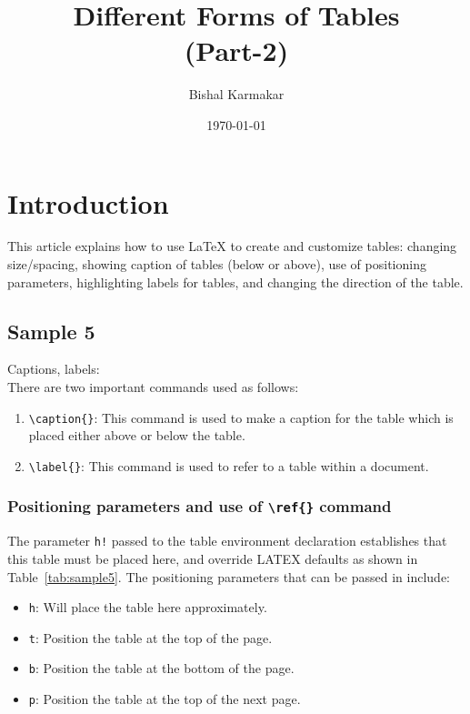 \documentclass{article}
\begin{document}
\title{\textbf{Different Forms of Tables}\\\textbf{ (Part-2)}}
\author{Bishal Karmakar}
\date{\today}
\maketitle

\section{Introduction}
This article explains how to use LaTeX to create and customize tables: changing size/spacing, showing caption of tables (below or above), use of positioning parameters, highlighting labels for tables, and changing the direction of the table.

\subsection{Sample 5}
Captions, labels: \\
There are two important commands used as follows:
\begin{enumerate}
  \item \texttt{\textbackslash caption\{\}}: This command is used to make a caption for the table which is placed either above or below the table.
  \item \texttt{\textbackslash label\{\}}: This command is used to refer to a table within a document.
\end{enumerate}

\subsubsection{Positioning parameters and use of \texttt{\textbackslash ref\{\}} command}
The parameter \texttt{h!} passed to the table environment declaration establishes that this table must be placed here, and override LATEX defaults as shown in Table~\ref{tab:sample5}. The positioning parameters that can be passed in include:
\begin{itemize}
  \item \texttt{h}: Will place the table here approximately.
  \item \texttt{t}: Position the table at the top of the page.
  \item \texttt{b}: Position the table at the bottom of the page.
  \item \texttt{p}: Position the table at the top of the next page.
\end{itemize}
\end{document}
